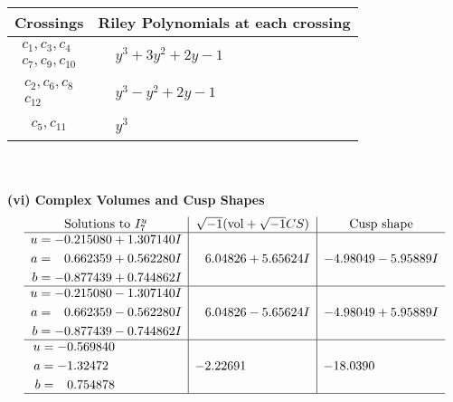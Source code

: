 \documentclass[1p]{elsarticle_modified}
\theoremstyle{definition}
\newcommand{\I}{\sqrt{-1}}
\begin{document}
\begin{tabular}{m{50pt}|m{274pt}}
Crossings & \hspace{64pt}Riley Polynomials at each crossing \\
\hline $$\begin{aligned}c_{1},c_{3},c_{4}\\c_{7},c_{9},c_{10}\end{aligned}$$&$\begin{aligned}
&y^3+3 y^2+2 y-1
\end{aligned}$\\
\hline $$\begin{aligned}c_{2},c_{6},c_{8}\\c_{12}\end{aligned}$$&$\begin{aligned}
&y^3- y^2+2 y-1
\end{aligned}$\\
\hline $$\begin{aligned}c_{5},c_{11}\end{aligned}$$&$\begin{aligned}
&y^3
\end{aligned}$\\
\hline
\end{tabular}\\~\\
\newpage\flushleft \textbf{(vi) Complex Volumes and Cusp Shapes}
$$\begin{array}{c|c|c}  
\text{Solutions to }I^u_{7}& \I (\text{vol} + \sqrt{-1}CS) & \text{Cusp shape}\\
 \hline 
\begin{aligned}
u &= -0.215080 + 1.307140 I \\
a &= \phantom{-}0.662359 + 0.562280 I \\
b &= -0.877439 + 0.744862 I\end{aligned}
 & \phantom{-}6.04826 + 5.65624 I & -4.98049 - 5.95889 I \\ \hline\begin{aligned}
u &= -0.215080 - 1.307140 I \\
a &= \phantom{-}0.662359 - 0.562280 I \\
b &= -0.877439 - 0.744862 I\end{aligned}
 & \phantom{-}6.04826 - 5.65624 I & -4.98049 + 5.95889 I \\ \hline\begin{aligned}
u &= -0.569840\phantom{ +0.000000I} \\
a &= -1.32472\phantom{ +0.000000I} \\
b &= \phantom{-}0.754878\phantom{ +0.000000I}\end{aligned}
 & -2.22691\phantom{ +0.000000I} & -18.0390\phantom{ +0.000000I}\\
 \hline 
 \end{array}$$\newpage\newpage\renewcommand{\arraystretch}{1}
\end{document}
